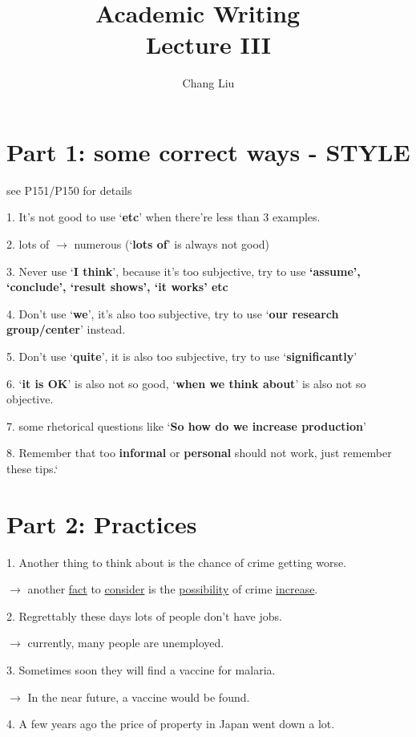\documentclass{article}
\title{Academic Writing ~\\ Lecture III}
\author{Chang Liu}
\begin{document}
\maketitle

\section{Part 1: some correct ways - STYLE}

see P151/P150 for details

1. It's not good to use `\textbf{etc}' when there're less than 3 examples.

2. lots of $\rightarrow$ numerous (`\textbf{lots of}' is always not good)

3. Never use `\textbf{I think}', because it's too subjective, try to use \textbf{`assume', `conclude', `result shows', `it works' etc}

4. Don't use `\textbf{we}', it's also too subjective, try to use `\textbf{our research group/center}' instead.

5. Don't use `\textbf{quite}', it is also too subjective, try to use `\textbf{significantly}'

6. `\textbf{it is OK}' is also not so good, `\textbf{when we think about}' is also not so objective.

7. some rhetorical questions like `\textbf{So how do we increase production}'

8. Remember that too \textbf{informal} or \textbf{personal} should not work, just remember these tips.`

\section{Part 2: Practices}

1. Another thing to think about is the chance of crime getting worse.

$\rightarrow$ another \underline{fact} to \underline{consider} is the \underline{possibility} of crime \underline{increase}.

2. Regrettably these days lots of people don't have jobs.

$\rightarrow$ currently, many people are unemployed.

3. Sometimes soon they will find a vaccine for malaria.

$\rightarrow$ In the near future, a vaccine would be found.

4. A few years ago the price of property in Japan went down a lot.
\end{document}

